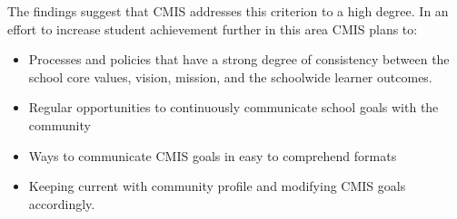 \begin{findings}

The findings suggest that CMIS addresses this criterion to a high degree. In an effort to increase student achievement further in this area CMIS plans to:


\begin{itemize}
\item Processes and policies that have a strong degree of consistency between the school core values, vision, mission, and the schoolwide learner outcomes.
\item Regular opportunities to continuously communicate school goals with the community
\end{itemize}


\begin{itemize}
\item Ways to communicate CMIS goals in easy to comprehend formats
\item Keeping current with community profile and modifying CMIS goals accordingly.
\end{itemize}

\end{findings}
